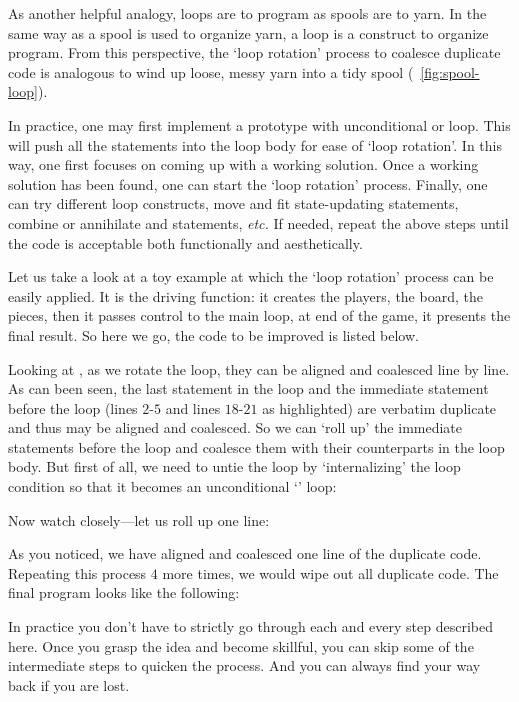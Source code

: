 As another helpful analogy, loops are to program as spools are to yarn.
In the same way as a spool is used to organize yarn, a loop is a construct to organize program.
From this perspective, the `loop rotation' process to coalesce duplicate code is analogous to
wind up loose, messy yarn into a tidy spool (~\autoref{fig:spool-loop}).


In practice, one may first implement a prototype with unconditional  or
 loop.
This will push all the statements into the loop body for ease of `loop rotation'.
In this way, one first focuses on coming up with a working solution.
Once a working solution has been found, one can start the `loop rotation' process.
Finally, one can try different loop constructs, move and fit state-updating statements,
combine or annihilate  and  statements, \textit{etc.}
If needed, repeat the above steps until the code is acceptable both functionally and
aesthetically.


Let us take a look at a toy example at which the `loop rotation' process can be easily applied.
It is the driving function: it creates the players, the board, the pieces, then it passes
control to the main loop, at end of the game, it presents the final result.
So here we go, the code to be improved is listed below.
\begin{clisting}[H]
    
\end{clisting}
Looking at , as we rotate the loop, they can be aligned and coalesced line by line.
As can been seen, the last statement in the loop and the immediate statement before the loop
(lines $2$-$5$ and lines $18$-$21$ as highlighted)
are verbatim duplicate and thus may be aligned and coalesced.
So we can `roll up' the immediate statements before the loop and coalesce them with their
counterparts in the loop body.
But first of all, we need to untie the loop by `internalizing' the loop condition
so that it becomes an unconditional `' loop:
\begin{clisting}[H]
    
\end{clisting}
Now watch closely---let us roll up one line:
\begin{clisting}[H]
    
\end{clisting}
As you noticed, we have aligned and coalesced one line of the duplicate code.
Repeating this process $4$ more times, we would wipe out all duplicate code.
The final program looks like the following:
\begin{clisting}[H]
    
\end{clisting}
In practice you don't have to strictly go through each and every step described here.
Once you grasp the idea and become skillful, you can skip some of the intermediate steps
to quicken the process.
And you can always find your way back if you are lost.



